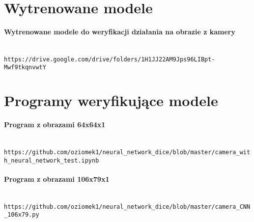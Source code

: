 \section{Wytrenowane modele}

\paragraph{Wytrenowane modele do weryfikacji działania na obrazie z kamery} \mbox{}\\
\texttt{https://drive.google.com/drive/folders/1H1JJ22AM9Jps96LIBpt-Mwf9tkqnvwtY}

\section{Programy weryfikujące modele}

\paragraph{Program z obrazami 64x64x1} \mbox{}\\
\texttt{https://github.com/oziomek1/neural\_network\_dice/blob/master/camera\_with\_neural\_network\_test.ipynb}

\paragraph{Program z obrazami 106x79x1} \mbox{}\\
\texttt{https://github.com/oziomek1/neural\_network\_dice/blob/master/camera\_CNN\_106x79.py}
